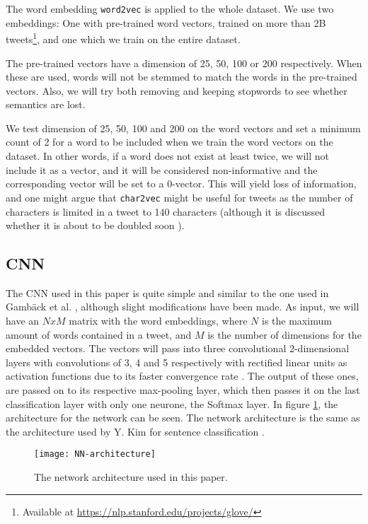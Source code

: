 \documentclass[twocolumn]{article}
\begin{document}
The word embedding \verb|word2vec| is applied to the whole dataset. We use two embeddings: One with pre-trained word vectors, trained on more than 2B tweets\footnote{Available at \url{https://nlp.stanford.edu/projects/glove/}}, and one which we train on the entire dataset. 

The pre-trained vectors have a dimension of 25, 50, 100 or 200 respectively. When these are used, words will not be stemmed to match the words in the pre-trained vectors. Also, we will try both removing and keeping stopwords to see whether semantics are lost. 

We test dimension of 25, 50, 100 and 200 on the word vectors and set a minimum count of 2 for a word to be included when we train the word vectors on the dataset. In other words, if a word does not exist at least twice, we will not include it as a vector, and it will be considered non-informative and the corresponding vector will be set to a 0-vector. This will yield loss of information, and one might argue that \verb|char2vec| might be useful for tweets as the number of characters is limited in a tweet to 140 characters (although it is discussed whether it is about to be doubled soon \cite{CNN}). 

\subsection{CNN}

The CNN used in this paper is quite simple and similar to the one used in Gamb\"ack et al. \cite{Gambck2017}, although slight modifications have been made. As input, we will have an $NxM$ matrix with the word embeddings, where $N$ is the maximum amount of words contained in a tweet, and $M$ is the number of dimensions for the embedded vectors. The vectors will pass into three convolutional 2-dimensional layers with convolutions of 3, 4 and 5 respectively with rectified linear units as activation functions due to its faster convergence rate \cite{Krizhevsky}. The output of these ones, are passed on to its respective max-pooling layer, which then passes it on the last classification layer with only one neurone, the Softmax layer. In figure \ref{fig:myNN}, the architecture for the network can be seen. The network architecture is the same as the architecture used by Y. Kim for sentence classification \cite{KimYoon}.

\begin{figure}
  \texttt{[image: NN-architecture]}
  \caption{The network architecture used in this paper. }
  \label{fig:myNN}
\end{figure} 
\end{document}
